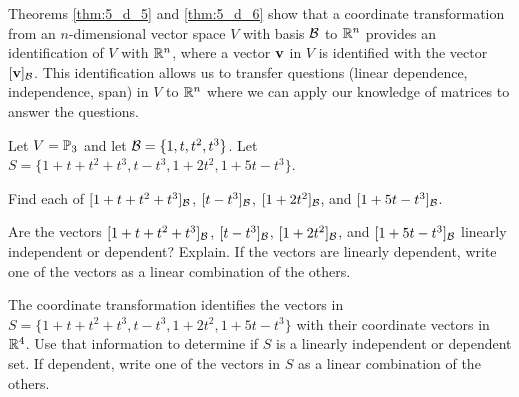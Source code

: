 


Theorems \ref{thm:5_d_5} and \ref{thm:5_d_6} show that a coordinate transformation from an $n$-dimensional vector space $V$ with basis $\mathcal{B}$ to $\mathbb{R}^n$ provides an identification of $V$ with $\mathbb{R}^n$, where a vector $\mathbf{v}$ in $V$ is identified with the vector $[\mathbf{v}]_{\mathcal{B}}$. This identification allows us to transfer questions (linear dependence, independence, span) in $V$ to $\mathbb{R}^n$ where we can apply our knowledge of matrices to answer the questions. 



\begin{activity} \label{act:5_d_7} Let $V = \mathbb{P}_3$ and let $\mathcal{B} = \{1,t,t^2,t^3\}$. Let $S = \{1+t+t^2+t^3, t-t^3, 1+2t^2, 1+5t-t^3\}$.
\ba
\item Find each of $[1+t+t^2+t^3]_{\mathcal{B}}$, $[t-t^3]_{\mathcal{B}}$, $[1+2t^2]_{\mathcal{B}}$, and $[1+5t-t^3]_{\mathcal{B}}$.



\item Are the vectors $[1+t+t^2+t^3]_{\mathcal{B}}$, $[t-t^3]_{\mathcal{B}}$, $[1+2t^2]_{\mathcal{B}}$, and $[1+5t-t^3]_{\mathcal{B}}$ linearly independent or dependent? Explain. If the vectors are linearly dependent, write one of the vectors as a linear combination of the others.



\item The coordinate transformation identifies the vectors in $S = \{1+t+t^2+t^3, t-t^3, 1+2t^2, 1+5t-t^3\}$ with their coordinate vectors in $\mathbb{R}^4$. Use that information to determine if $S$ is a linearly independent or dependent set. If dependent, write one of the vectors in $S$ as a linear combination of the others.



\ea
\end{activity}

